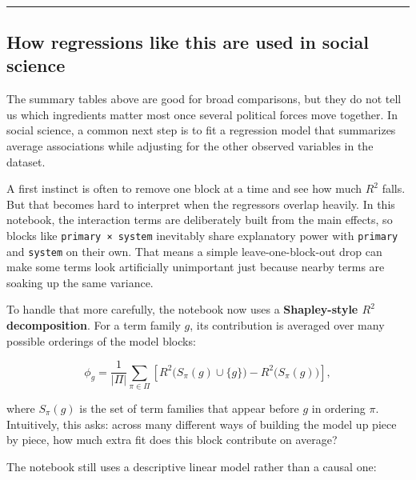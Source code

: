 \documentclass[11pt]{article}
\begin{document}
    \begin{center}
    \end{center}
    { \hspace*{\fill} \\}
    
    \begin{center}\rule{0.5\linewidth}{0.5pt}\end{center}

\subsection{How regressions like this are used in social
science}\label{how-regressions-like-this-are-used-in-social-science}

The summary tables above are good for broad comparisons, but they do not
tell us which ingredients matter most once several political forces move
together. In social science, a common next step is to fit a regression
model that summarizes average associations while adjusting for the other
observed variables in the dataset.

A first instinct is often to remove one block at a time and see how much
\(R^2\) falls. But that becomes hard to interpret when the regressors
overlap heavily. In this notebook, the interaction terms are
deliberately built from the main effects, so blocks like
\texttt{primary\ ×\ system} inevitably share explanatory power with
\texttt{primary} and \texttt{system} on their own. That means a simple
leave-one-block-out drop can make some terms look artificially
unimportant just because nearby terms are soaking up the same variance.

To handle that more carefully, the notebook now uses a
\textbf{Shapley-style \(R^2\) decomposition}. For a term family \(g\),
its contribution is averaged over many possible orderings of the model
blocks:

\[
\phi_g = \frac{1}{|\Pi|} \sum_{\pi \in \Pi} \left[ R^2\bigl(S_{\pi}(g) \cup \{g\}\bigr) - R^2\bigl(S_{\pi}(g)\bigr) \right],
\]

where \(S_{\pi}(g)\) is the set of term families that appear before
\(g\) in ordering \(\pi\). Intuitively, this asks: across many different
ways of building the model up piece by piece, how much extra fit does
this block contribute on average?

The notebook still uses a descriptive linear model rather than a causal
one:
\end{document}
